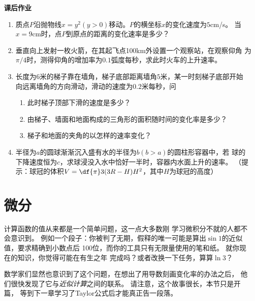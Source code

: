 \begin{ext}
	{\centering\bf 课后作业}
	
	\begin{enumerate}  
	  \item 质点$P$沿抛物线$x=y^2(y>0)$移动。$P$的横坐标$x$的变化速度为$5$cm/s。
		当$x=9$cm时，点$P$到原点的距离的变化速率是多少？
	  \item 垂直向上发射一枚火箭，在其起飞点100km外设置一个观察站，在观察仰角
	  为$\pi/4$时，测得仰角的增加率为$0.1$弧度每秒，求此时火车的上升速率。
	  \item 长度为$6$米的梯子靠在墙角，梯子底部距离墙角$5$米，某一时刻梯子底部开始
	  向远离墙角的方向滑动，滑动的速度为$0.2$米每秒，问
	  \begin{enumerate}[(1)]
	    \item 此时梯子顶部下滑的速度是多少？
	    \item 由梯子、墙面和地面构成的三角形的面积随时间的变化率是多少？
	    \item 梯子和地面的夹角的以怎样的速率变化？
	  \end{enumerate}
	  \item 半径为$a$的圆球渐渐沉入盛有水的半径为$b(b>a)$的圆柱形容器中，若
	  球的下降速度恒为$c$，求球浸没入水中恰好一半时，容器内水面上升的速率。
	  （提示：球冠的体积$V=\df{\pi}3(3R-H)H^2$，其中$H$为球冠的高度）
	\end{enumerate}
\end{ext}

\section{微分}

计算函数的值从来都是一个简单问题，这一点大多数刚
学习微积分不就的人都不会意识到。
例如一个段子：你被判了无期，假释的唯一可能是算出$\sin 1$的近似值，要求精确到小数点后
100位，而你的工具只有无限量使用的笔和纸。
就你现在的知识，你觉得可能在有生之年
完成吗？或者改换一下任务，算算$\ln 3$？

数学家们显然也意识到了这个问题，在想出了用导数刻画变化率的办法之后，
他们很快发现了它与{\it 近似计算}之间的联系。
请注意，这个故事很长，本节只是开篇，
等到下一章学习了Taylor公式后才能真正告一段落。

